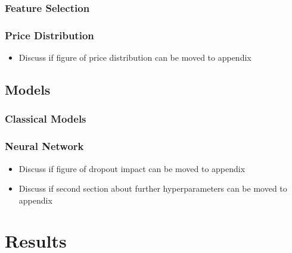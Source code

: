 \documentclass[12pt, letterpaper]{article}
\begin{document}
\subsubsection{Feature Selection} %


\subsubsection{Price Distribution} %

\begin{itemize}
    \item Discuss if figure of price distribution can be moved to appendix
\end{itemize}



\subsection{Models} %

\subsubsection{Classical Models} %

\subsubsection{Neural Network} %

\begin{itemize}
    \item Discuss if figure of dropout impact can be moved to appendix
    \item Discuss if second section about further hyperparameters can be moved to appendix
\end{itemize}



\section{Results} %

\end{document}
